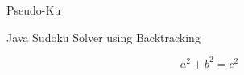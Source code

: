 \documentclass{article}
\begin{document}
    Pseudo-Ku

    Java Sudoku Solver using Backtracking

    $$a^2 + b^2 = c^2$$
\end{document}

